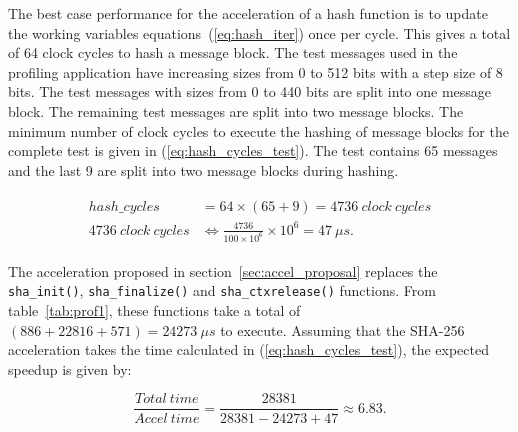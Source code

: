 The best case performance for the acceleration of a hash function is to update
the working variables equations~(\ref{eq:hash_iter}) once per cycle. This gives
a total of 64 clock cycles to hash a message block. 
The test messages used in the profiling application have increasing sizes from
0 to 512 bits with a step size of 8 bits. The test messages with sizes from 0
to 440 bits are split into one message block. The remaining test messages are
split into two message blocks. 
The minimum number of clock cycles to execute the hashing of message blocks for
the complete test is given in (\ref{eq:hash_cycles_test}). The test contains 65
messages and the last 9 are split into two message blocks during hashing.

\begin{align}
    \begin{split}
    hash\_cycles &= 64 \times ( 65 + 9 ) = 4736 \ clock \ cycles \\
    4736 \ clock \ cycles &\Leftrightarrow \frac{4736}{100\times 10^{6}}\times 10^{6} = 47 \ \mu s.
    \end{split}
\label{eq:hash_cycles_test}
\end{align}

The acceleration proposed in section~\ref{sec:accel_proposal} replaces the 
\texttt{sha\_init()}, \texttt{sha\_finalize()} and \texttt{sha\_ctxrelease()} 
functions. From table~\ref{tab:prof1}, these functions take a total of 
$ (886 + 22816 + 571) = 24273 \ \mu s$ to execute. Assuming that the SHA-256
acceleration takes the time calculated in (\ref{eq:hash_cycles_test}), the
expected speedup is given by:

\begin{equation}
    \frac{Total\ time}{Accel\ time} = \frac{28381}{28381 - 24273 + 47} \approx 6.83.
\label{eq:expected_speedup}
\end{equation}

